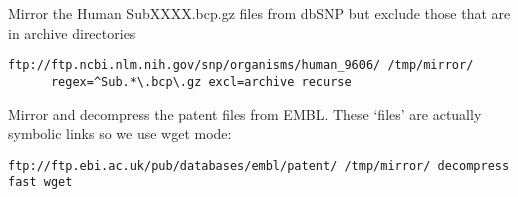 \documentclass{article}
\begin{document}
\noindent Mirror the Human SubXXXX.bcp.gz files from dbSNP but exclude
those that are in archive directories
{\footnotesize
\begin{verbatim}
ftp://ftp.ncbi.nlm.nih.gov/snp/organisms/human_9606/ /tmp/mirror/ 
      regex=^Sub.*\.bcp\.gz excl=archive recurse
\end{verbatim}
}

\noindent Mirror and decompress the patent files from EMBL. These
`files' are actually symbolic links so we use wget mode:
{\footnotesize
\begin{verbatim}
ftp://ftp.ebi.ac.uk/pub/databases/embl/patent/ /tmp/mirror/ decompress fast wget
\end{verbatim}
}
\end{document}

